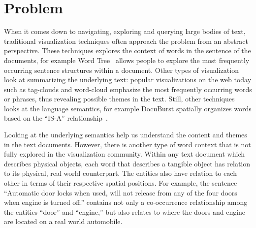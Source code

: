 

\section{Problem}
When it comes down to navigating, exploring and querying large bodies of text,
traditional visualization techniques often approach the problem from an abstract
perspective. These techniques explores the context of words in the sentence of
the documents, for example Word Tree~\cite{Wattenberg2008} allows people to
explore the most frequently occurring sentence structures within a document.
Other types of visualization look at summarizing the underlying text: popular 
visualizations on the web today such as tag-clouds and word-cloud emphasize
the most frequently occurring words or phrases, thus revealing possible themes in
the text. Still, other techniques looks at the language semantics, for example 
DocuBurst spatially organizes words based on the ``IS-A''
relationship~\cite{COL2009a}.

Looking at the underlying semantics help us understand the content and 
themes in the text documents. However, there is another type of word context 
that is not fully explored in the visualization community. Within any text 
document which describes physical objects, each word that describes a 
tangible object has relation to its physical, real world counterpart. The 
entities also have relation to each other in terms of their respective 
spatial positions. For example, the sentence ``Automatic door locks when 
used, will not release from any of the four doors when engine is turned off.'' 
contains not only a co-occurrence relationship among the entities ``door'' and 
``engine,'' but also relates to where the doors and engine are located on a 
real world automobile.


